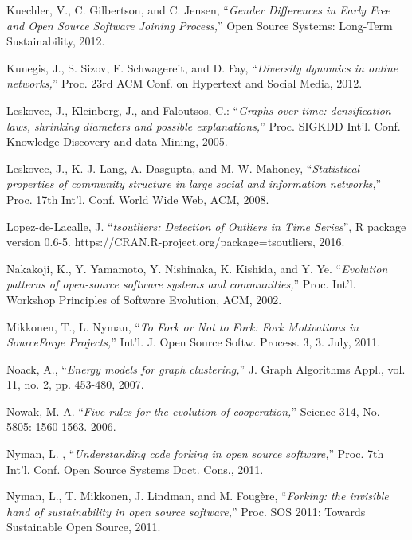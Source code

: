 \begin{thebibliography}{99.}
 Kuechler, V., C. Gilbertson, and C. Jensen, ``\textit{Gender Differences in Early Free and Open Source Software Joining Process,}'' Open Source Systems: Long-Term Sustainability, 2012. 

 Kunegis, J., S. Sizov, F. Schwagereit, and D. Fay, ``\textit{Diversity dynamics in online networks,}'' Proc. 23rd ACM Conf. on Hypertext and Social Media, 2012. 

 Leskovec, J., Kleinberg, J., and Faloutsos, C.: ``\textit{Graphs over time: densification laws, shrinking diameters and possible explanations,}'' Proc. SIGKDD Int'l. Conf. Knowledge Discovery and data Mining, 2005. 

 Leskovec, J., K. J. Lang, A. Dasgupta, and M. W. Mahoney, ``\textit{Statistical properties of community structure in large social and information networks,}'' Proc. 17th Int'l. Conf. World Wide Web, ACM, 2008.

 Lopez-de-Lacalle, J. ``\textit{tsoutliers: Detection of Outliers in Time Series}'', R package version 0.6-5. https://CRAN.R-project.org/package=tsoutliers, 2016.

 Nakakoji, K., Y. Yamamoto, Y. Nishinaka, K. Kishida, and Y. Ye. ``\textit{Evolution patterns of open-source software systems and communities,}'' Proc. Int'l. Workshop Principles of Software Evolution, ACM, 2002.

 Mikkonen, T., L. Nyman, ``\textit{To Fork or Not to Fork: Fork Motivations in SourceForge Projects,}'' Int'l. J. Open Source Softw. Process. 3, 3. July, 2011.

 Noack, A., ``\textit{Energy models for graph clustering,}'' J. Graph Algorithms Appl., vol. 11, no. 2, pp. 453-480, 2007.

 Nowak, M. A. ``\textit{Five rules for the evolution of cooperation,}'' Science 314, No. 5805: 1560-1563. 2006.

 Nyman, L. , ``\textit{Understanding code forking in open source software,}'' Proc. 7th Int'l. Conf. Open Source Systems Doct. Cons., 2011. 

 Nyman, L., T. Mikkonen, J. Lindman, and M. Foug\`{e}re, ``\textit{Forking: the invisible hand of sustainability in open source software,}'' Proc. SOS 2011: Towards Sustainable Open Source, 2011. 


\end{thebibliography}
